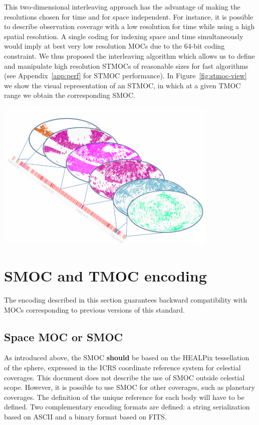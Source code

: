 \documentclass[11pt,a4paper]{ivoa}
\begin{document}
This two-dimensional interleaving approach has the advantage of making
the resolutions chosen for time and for space independent. For
instance, it is possible to describe observation coverage with a low
resolution for time while using a high spatial
resolution.
A single coding for indexing space and time simultaneously would imply
at best very low resolution MOCs due to the 64-bit coding constraint. 
We thus proposed the interleaving algorithm which allows us to define and
manipulate high resolution STMOCs of reasonable sizes for fast algorithms
(see Appendix~\ref{app:perf} for STMOC performance).
In Figure~\ref{fig:stmoc-view} we show the visual representation of an STMOC,
in which at a given TMOC range we obtain the corresponding SMOC. 
 
\begin{adjustbox}{center,caption={STMOC visual representation in which
      at a given TMOC range we obtain the corresponding SMOC},
    label={fig:stmoc-view},nofloat=figure,vspace=\bigskipamount}
\includegraphics[width=0.8\textwidth]{stmoc_view.png}
\end{adjustbox}

\section{SMOC and TMOC encoding}
The encoding described in this section guarantees backward compatibility
with MOCs corresponding to previous versions of this standard.

\subsection{Space MOC or SMOC}
As introduced above, the SMOC {\bf should} be based on the
HEALPix tessellation of the sphere, expressed in the ICRS coordinate
reference system for celestial coverages. This document does not describe
the use of SMOC outside celestial scope. However, it is possible to use
SMOC for other coverages, such as planetary coverages. The definition of
the unique reference for each body will have to be defined. Two complementary
encoding formats are defined: a string serialization based on ASCII and a
binary format based on FITS.
\end{document}
